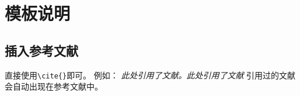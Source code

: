 \section{模板说明}
\setcounter{table}{0}
\setcounter{figure}{0}
\setcounter{equation}{0}
%
%
%
%
%
%
\subsection{插入参考文献}
直接使用\verb|\cite{}|即可。
例如：
   \textit{ 此处引用了文献\cite{OFDMAbackscatter}。此处引用了文献\cite{DigiScatter}}
引用过的文献会自动出现在参考文献中。
